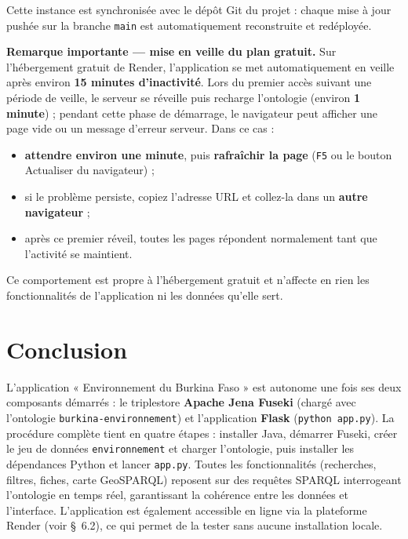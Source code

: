 ﻿\documentclass[12pt,a4paper]{report}
\begin{document}
\noindent Cette instance est synchronisée avec le dépôt Git du projet : chaque mise à jour
pushée sur la branche \texttt{main} est automatiquement reconstruite et redéployée.

\medskip\noindent\textbf{Remarque importante --- mise en veille du plan gratuit.} Sur l'hébergement
gratuit de Render, l'application se met automatiquement en veille après environ
\textbf{15 minutes d'inactivité}. Lors du premier accès suivant une période de veille, le serveur
se réveille puis recharge l'ontologie (environ \textbf{1 minute}) ; pendant cette phase de
démarrage, le navigateur peut afficher une page vide ou un message d'erreur serveur. Dans ce cas :

\begin{itemize}
\item \textbf{attendre environ une minute}, puis \textbf{rafraîchir la page} (\texttt{F5} ou le
      bouton Actualiser du navigateur) ;
\item si le problème persiste, copiez l'adresse URL et collez-la dans un \textbf{autre
      navigateur} ;
\item après ce premier réveil, toutes les pages répondent normalement tant que l'activité
      se maintient.
\end{itemize}

\noindent Ce comportement est propre à l'hébergement gratuit et n'affecte en rien les
fonctionnalités de l'application ni les données qu'elle sert.

\chapter{Conclusion}

L'application « Environnement du Burkina Faso » est autonome une fois ses deux composants démarrés :
le triplestore \textbf{Apache Jena Fuseki} (chargé avec l'ontologie \texttt{burkina-environnement}) et
l'application \textbf{Flask} (\texttt{python app.py}). La procédure complète tient en quatre étapes :
installer Java, démarrer Fuseki, créer le jeu de données \texttt{environnement} et charger
l'ontologie, puis installer les dépendances Python et lancer \texttt{app.py}. Toutes les
fonctionnalités (recherches, filtres, fiches, carte GeoSPARQL) reposent sur des requêtes SPARQL
interrogeant l'ontologie en temps réel, garantissant la cohérence entre les données et l'interface.
L'application est également accessible en ligne via la plateforme Render
(voir §~6.2), ce qui permet de la tester sans aucune installation locale.
\end{document}
